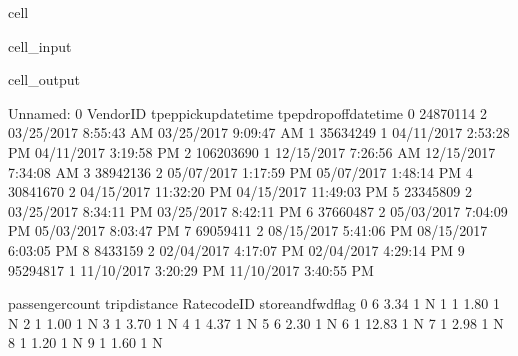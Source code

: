 \documentclass[letterpaper,10pt,english]{sphinxmanual}
\begin{document}
\begin{sphinxuseclass}{cell}
\begin{sphinxuseclass}{cell_input}
\begin{sphinxVerbatim}[commandchars=\\\{\}]
  

  
\end{sphinxVerbatim}

\end{sphinxuseclass}
\begin{sphinxuseclass}{cell_output}
\begin{sphinxVerbatim}[commandchars=\\\{\}]
   Unnamed: 0  VendorID    tpep\PYGZus{}pickup\PYGZus{}datetime   tpep\PYGZus{}dropoff\PYGZus{}datetime  \PYGZbs{}
0    24870114         2   03/25/2017 8:55:43 AM   03/25/2017 9:09:47 AM   
1    35634249         1   04/11/2017 2:53:28 PM   04/11/2017 3:19:58 PM   
2   106203690         1   12/15/2017 7:26:56 AM   12/15/2017 7:34:08 AM   
3    38942136         2   05/07/2017 1:17:59 PM   05/07/2017 1:48:14 PM   
4    30841670         2  04/15/2017 11:32:20 PM  04/15/2017 11:49:03 PM   
5    23345809         2   03/25/2017 8:34:11 PM   03/25/2017 8:42:11 PM   
6    37660487         2   05/03/2017 7:04:09 PM   05/03/2017 8:03:47 PM   
7    69059411         2   08/15/2017 5:41:06 PM   08/15/2017 6:03:05 PM   
8     8433159         2   02/04/2017 4:17:07 PM   02/04/2017 4:29:14 PM   
9    95294817         1   11/10/2017 3:20:29 PM   11/10/2017 3:40:55 PM   

   passenger\PYGZus{}count  trip\PYGZus{}distance  RatecodeID store\PYGZus{}and\PYGZus{}fwd\PYGZus{}flag  \PYGZbs{}
0                6           3.34           1                  N   
1                1           1.80           1                  N   
2                1           1.00           1                  N   
3                1           3.70           1                  N   
4                1           4.37           1                  N   
5                6           2.30           1                  N   
6                1          12.83           1                  N   
7                1           2.98           1                  N   
8                1           1.20           1                  N   
9                1           1.60           1                  N   


\end{sphinxVerbatim}
\end{sphinxuseclass}
\end{sphinxuseclass}
\end{document}
